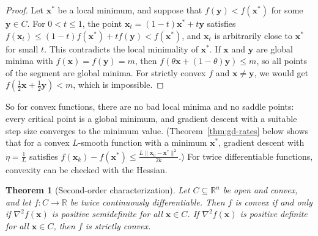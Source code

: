 \documentclass[11pt]{article}
\newcommand{\norm}[1]{\lVert #1 \rVert}
\theoremstyle{definition}
\theoremstyle{plain}
\newtheorem{theorem}[definition]{Theorem}
\theoremstyle{remark}
\begin{document}
\begin{proof}
    Let $\mathbf{x}^*$ be a local minimum, and suppose that $f(\mathbf{y}) < f(\mathbf{x}^*)$ for some $\mathbf{y} \in C$. For $0 < t \leq 1$, the point $\mathbf{x}_t = (1 - t)\mathbf{x}^* + t\mathbf{y}$ satisfies $f(\mathbf{x}_t) \leq (1 - t)f(\mathbf{x}^*) + tf(\mathbf{y}) < f(\mathbf{x}^*)$, and $\mathbf{x}_t$ is arbitrarily close to $\mathbf{x}^*$ for small $t$. This contradicts the local minimality of $\mathbf{x}^*$. If $\mathbf{x}$ and $\mathbf{y}$ are global minima with $f(\mathbf{x}) = f(\mathbf{y}) = m$, then $f(\theta\mathbf{x} + (1 - \theta)\mathbf{y}) \leq m$, so all points of the segment are global minima. For strictly convex $f$ and $\mathbf{x} \neq \mathbf{y}$, we would get $f(\frac{1}{2}\mathbf{x} + \frac{1}{2}\mathbf{y}) < m$, which is impossible.
\end{proof}

So for convex functions, there are no bad local minima and no saddle points: every critical point is a global minimum, and gradient descent with a suitable step size converges to the minimum value. (Theorem~\ref{thm:gd-rates} below shows that for a convex $L$-smooth function with a minimum $\mathbf{x}^*$, gradient descent with $\eta = \frac{1}{L}$ satisfies $f(\mathbf{x}_k) - f(\mathbf{x}^*) \leq \frac{L\norm{\mathbf{x}_0 - \mathbf{x}^*}^2}{2k}$.) For twice differentiable functions, convexity can be checked with the Hessian.

\begin{theorem}[Second-order characterization]\label{thm:convex-second-order}
    Let $C \subseteq \mathbb{R}^n$ be open and convex, and let $f: C \to \mathbb{R}$ be twice continuously differentiable. Then $f$ is convex if and only if $\nabla^2 f(\mathbf{x})$ is positive semidefinite for all $\mathbf{x} \in C$. If $\nabla^2 f(\mathbf{x})$ is positive definite for all $\mathbf{x} \in C$, then $f$ is strictly convex.
\end{theorem}
\end{document}
